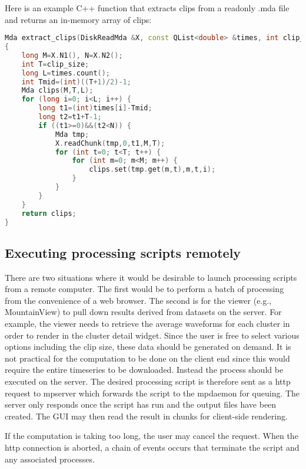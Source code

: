 \documentclass{article}
\begin{document}
Here is an example C++ function that extracts clips from a readonly .mda file and returns an in-memory array of clips:
\begin{lstlisting}[language=C++]
Mda extract_clips(DiskReadMda &X, const QList<double> &times, int clip_size)
{
    long M=X.N1(), N=X.N2();
    int T=clip_size;
    long L=times.count();
    int Tmid=(int)((T+1)/2)-1;
    Mda clips(M,T,L);
    for (long i=0; i<L; i++) {
        long t1=(int)times[i]-Tmid;
        long t2=t1+T-1;
        if ((t1>=0)&&(t2<N)) {
            Mda tmp;
            X.readChunk(tmp,0,t1,M,T);
            for (int t=0; t<T; t++) {
                for (int m=0; m<M; m++) {
                    clips.set(tmp.get(m,t),m,t,i);
                }
            }
        }
    }
    return clips;
}
\end{lstlisting}

\subsection{Executing processing scripts remotely}

There are two situations where it would be desirable to launch processing scripts from a remote computer. The first would be to perform a batch of processing from the convenience of a web browser. The second is for the viewer (e.g., MountainView) to pull down results derived from datasets on the server. For example, the viewer needs to retrieve the average waveforms for each cluster in order to render in the cluster detail widget. Since the user is free to select various options including the clip size, these data should be generated on demand. It is not practical for the computation to be done on the client end since this would require the entire timeseries to be downloaded. Instead the process should be executed on the server. The desired processing script is therefore sent as a http request to mpserver which forwards the script to the mpdaemon for queuing. The server only responds once the script has run and the output files have been created. The GUI may then read the result in chunks for client-side rendering.

If the computation is taking too long, the user may cancel the request. When the http connection is aborted, a chain of events occurs that terminate the script and any associated processes.
\end{document}

